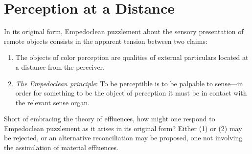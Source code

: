 \chapter{Perception at a Distance} %
\label{cha:perception_at_a_distance}

In its original form, Empedoclean puzzlement about the sensory presentation of remote objects consists in the apparent tension between two claims:
\begin{enumerate}[(1)]
    \item The objects of color perception are qualities of external particulars located at a distance from the perceiver.
    \item \emph{The Empedoclean principle}: To be perceptible is to be palpable to sense---in order for something to be the object of perception it must be in contact with the relevant sense organ.
\end{enumerate}
Short of embracing the theory of effluences, how might one respond to Empedoclean puzzlement as it arises in its original form? Either (1) or (2) may be rejected, or an alternative reconciliation may be proposed, one not involving the assimilation of material effluences.


